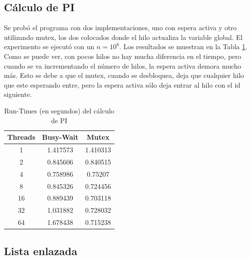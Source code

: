 \documentclass[a4paper,12pt]{article}
\begin{document}
\subsection{Cálculo de PI}

Se probó el programa con dos implementaciones, uno con espera activa y otro utilizando mutex, los dos colocados donde el
hilo actualiza la variable global. El experimento se ejecutó con un $n = 10^{8}$. Los resultados se muestran en la Tabla 
\ref{tab:pi}. Como se puede ver, con pocos hilos no hay mucha diferencia en el tiempo, pero cuando se va incrementando el
número de hilos, la espera activa demora mucho más. Esto se debe a que el mutex, cuando se desbloquea, deja que cualquier
hilo que este esperando entre, pero la espera activa sólo deja entrar al hilo con el id siguiente.

\begin{table}
\begin{center}
\begin{tabular}{|c|c|c|}\hline
Threads & Busy-Wait & Mutex\\\hline
1 & 1.417573 & 1.410313\\\hline
2 & 0.845606 & 0.840515\\\hline
4 & 0.758986 & 0.75207\\\hline
8 & 0.845326 & 0.724456\\\hline
16 & 0.889439 & 0.703118\\\hline
32 & 1.031882 & 0.728032\\\hline
64 & 1.678438 & 0.715238\\\hline
\end{tabular}
\end{center}
\caption{Run-Times (en segundos) del cálculo de PI}
\label{tab:pi}
\end{table}

\subsection{Lista enlazada}
\end{document}
